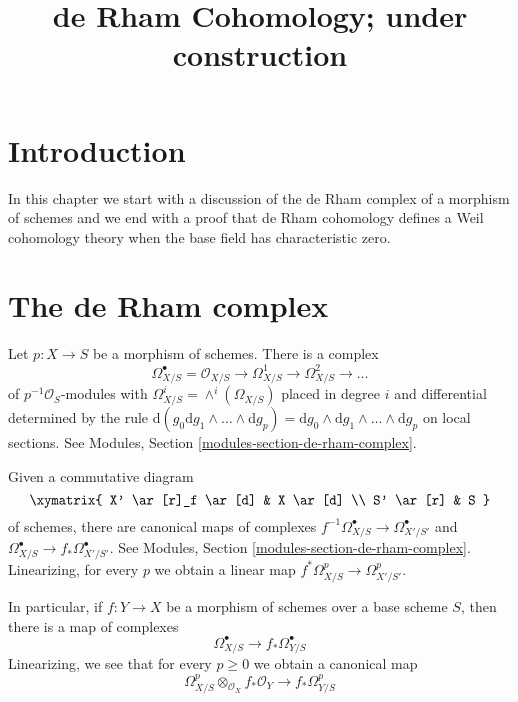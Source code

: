 

%


\title{de Rham Cohomology; under construction}


\maketitle

\label{section-phantom}

\tableofcontents

\section{Introduction}
\label{section-introduction}

\noindent
In this chapter we start with a discussion of the de Rham complex
of a morphism of schemes and we end with a proof that de Rham cohomology
defines a Weil cohomology theory when the base field has characteristic zero.




\section{The de Rham complex}
\label{section-de-rham-complex}

\noindent
Let $p : X \to S$ be a morphism of schemes. There is a complex
$$
\Omega^\bullet_{X/S} =
\mathcal{O}_{X/S} \to \Omega^1_{X/S} \to \Omega^2_{X/S} \to \ldots
$$
of $p^{-1}\mathcal{O}_S$-modules with
$\Omega^i_{X/S} = \wedge^i(\Omega_{X/S})$
placed in degree $i$ and differential determined by the rule
$\text{d}(g_0 \text{d}g_1 \wedge \ldots \wedge \text{d}g_p) =
\text{d}g_0 \wedge \text{d}g_1 \wedge \ldots \wedge \text{d}g_p$
on local sections.
See Modules, Section \ref{modules-section-de-rham-complex}.

\medskip\noindent
Given a commutative diagram
$$
\xymatrix{
X' \ar[r]_f \ar[d] & X \ar[d] \\
S' \ar[r] & S
}
$$
of schemes, there are canonical maps of complexes
$f^{-1}\Omega_{X/S}^\bullet \to \Omega^\bullet_{X'/S'}$ and
$\Omega_{X/S}^\bullet \to f_*\Omega^\bullet_{X'/S'}$.
See Modules, Section \ref{modules-section-de-rham-complex}.
Linearizing, for every $p$ we obtain a linear map
$f^*\Omega^p_{X/S} \to \Omega^p_{X'/S'}$.

\medskip\noindent
In particular, if $f : Y \to X$ be a morphism of schemes over
a base scheme $S$, then there is a map of complexes
$$
\Omega^\bullet_{X/S} \longrightarrow f_*\Omega^\bullet_{Y/S}
$$
Linearizing, we see that for every $p \geq 0$ we obtain a canonical map
$$
\Omega^p_{X/S} \otimes_{\mathcal{O}_X} f_*\mathcal{O}_Y
\longrightarrow
f_*\Omega^p_{Y/S}
$$


